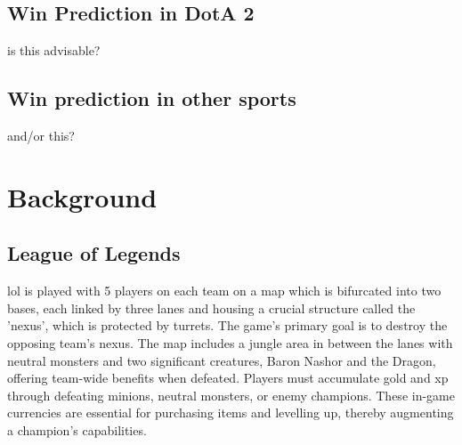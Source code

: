 \documentclass[12pt, a4paper, headinclude, twoside, plainheadsepline, open=right, numbers=noenddot, hidelinks, toc=listof, toc=bibliography]{scrreprt}
\begin{document}
\section{Win Prediction in DotA 2}
\label{sec:dota}
is this advisable?
%


%
%
%

\section{Win prediction in other sports}
\label{sec:other_sports}
and/or this?

\chapter{Background}
\label{chap:background}

\section{League of Legends}
\label{sec:LoL}

\Ac{lol} is played with 5 players on each team on a map which is bifurcated into two bases, each linked by three lanes and housing a crucial structure called the 'nexus', which is protected by turrets. 
The game's primary goal is to destroy the opposing team's nexus.
The map includes a jungle area in between the lanes with neutral monsters and two significant creatures, Baron Nashor and the Dragon, offering team-wide benefits when defeated.
Players must accumulate gold and \ac{xp} through defeating minions, neutral monsters, or enemy champions. 
These in-game currencies are essential for purchasing items and levelling up, thereby augmenting a champion's capabilities.
\end{document}
